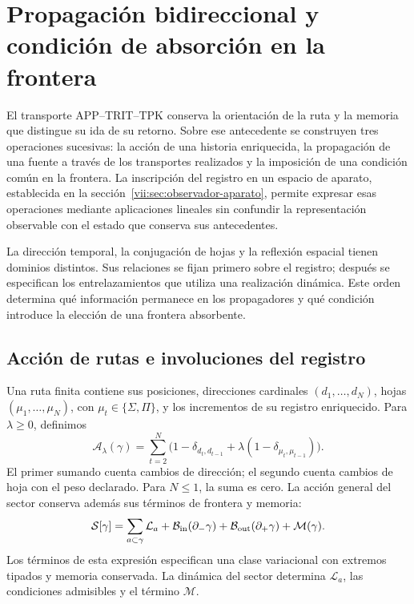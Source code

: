 
\section{Propagación bidireccional y condición de absorción en la frontera}
\label{vii:sec:propagacion-bidireccional}

El transporte APP--TRIT--TPK conserva la orientación de la ruta y la memoria
que distingue su ida de su retorno. Sobre ese antecedente se construyen tres
operaciones sucesivas: la acción de una historia enriquecida, la propagación
de una fuente a través de los transportes realizados y la imposición de una
condición común en la frontera. La inscripción del registro en un espacio de
aparato, establecida en la sección~\ref{vii:sec:observador-aparato}, permite
expresar esas operaciones mediante aplicaciones lineales sin confundir la
representación observable con el estado que conserva sus antecedentes.

La dirección temporal, la conjugación de hojas y la reflexión espacial
tienen dominios distintos. Sus relaciones se fijan primero sobre el registro;
después se especifican los entrelazamientos que utiliza una realización
dinámica. Este orden determina qué información permanece en los propagadores
y qué condición introduce la elección de una frontera absorbente.

\subsection{Acción de rutas e involuciones del registro}
\label{vii:subsec:accion-bidireccional}

Una ruta finita contiene sus posiciones, direcciones cardinales
\((d_1,\ldots,d_N)\), hojas \((\mu_1,\ldots,\mu_N)\), con
\(\mu_t\in\{\Sigma,\Pi\}\), y los incrementos de su registro
enriquecido. Para \(\lambda\geq0\), definimos
\begin{equation}
 \mathcal A_\lambda(\gamma)
 =\sum_{t=2}^N
 \bigl(1-\delta_{d_t,d_{t-1}}
       +\lambda(1-\delta_{\mu_t,\mu_{t-1}})\bigr).
 \label{vii:eq:accion-ruta-bidireccional}
\end{equation}
El primer sumando cuenta cambios de dirección; el segundo cuenta cambios
de hoja con el peso declarado. Para \(N\leq1\), la suma es cero.
La acción general del sector conserva además sus términos de frontera y
memoria:
\begin{equation}
 \mathcal S[\gamma]
 =\sum_{a\subset\gamma}\mathcal L_a
  +\mathcal B_{\rm in}(\partial_-\gamma)
  +\mathcal B_{\rm out}(\partial_+\gamma)
  +\mathcal M(\gamma).
 \label{vii:eq:accion-enriquecida-frontera}
\end{equation}
Los términos de esta expresión especifican una clase variacional con
extremos tipados y memoria conservada. La dinámica del sector determina
\(\mathcal L_a\), las condiciones admisibles y el término \(\mathcal M\).

